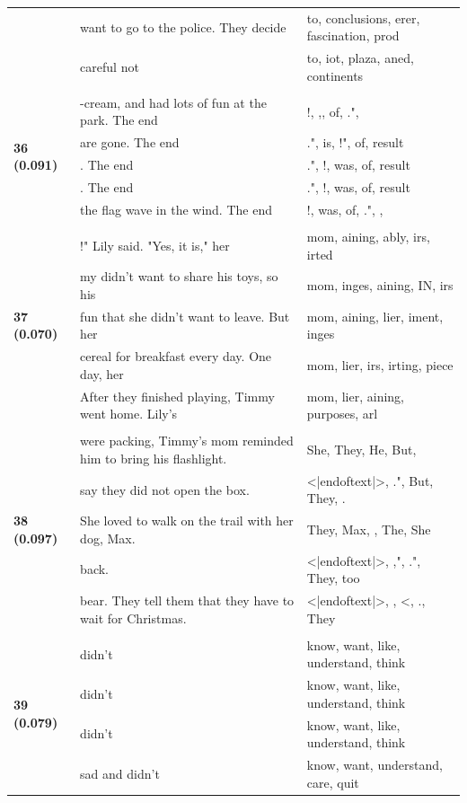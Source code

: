 \documentclass{article}
\theoremstyle{plain}
\theoremstyle{definition}
\theoremstyle{remark}
\begin{document}
\begin{longtable}{|p{}|p{}|p{}|}
& want to go to the police. They decide & to,  conclusions, erer,  fascination,  prod \\
& careful not & to, iot,  plaza, aned,  continents \\
& & \\
\multirow{5}{*}{\textbf{36 (0.091)}} & -cream, and had lots of fun at the park. The end & !, ,,  of, .", \\
& are gone. The end & .",  is, !",  of,  result \\
& . The end & .", !,  was,  of,  result \\
& . The end & .", !,  was,  of,  result \\
& the flag wave in the wind. The end & !,  was,  of, .", , \\
& & \\
\multirow{5}{*}{\textbf{37 (0.070)}} & !" Lily said. "Yes, it is," her & mom, aining, ably, irs, irted \\
& my didn't want to share his toys, so his & mom, inges, aining, IN, irs \\
& fun that she didn't want to leave. But her & mom, aining, lier, iment, inges \\
& cereal for breakfast every day. One day, her & mom, lier, irs, irting, piece \\
& After they finished playing, Timmy went home. Lily's & mom, lier, aining,  purposes, arl \\
& & \\
\multirow{5}{*}{\textbf{38 (0.097)}} & were packing, Timmy's mom reminded him to bring his flashlight. & She,  They,  He,  But, \\
& say they did not open the box. & <|endoftext|>, .", But,  They, . \\
& She loved to walk on the trail with her dog, Max. & They,  Max,  ,  The,  She \\
& back. & <|endoftext|>, ,", .",  They,  too \\
& bear. They tell them that they have to wait for Christmas. & <|endoftext|>,  , <, .,  They \\
& & \\
\multirow{5}{*}{\textbf{39 (0.079)}} & didn't & know,  want,  like,  understand,  think \\
& didn't & know,  want,  like,  understand,  think \\
& didn't & know,  want,  like,  understand,  think \\
& sad and didn't & know,  want,  understand,  care,  quit \\

\end{longtable}
\end{document}
